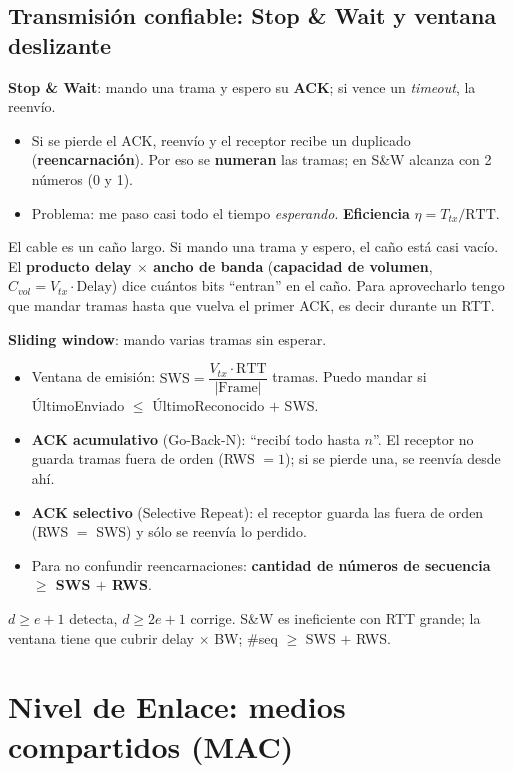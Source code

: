 \documentclass[10pt,a4paper]{article}
\newcommand{\term}[1]{\textbf{\color{azul}#1}}
\begin{document}
\subsection{Transmisión confiable: Stop \& Wait y ventana deslizante}
\textbf{Stop \& Wait}: mando una trama y espero su \term{ACK}; si vence un \emph{timeout}, la reenvío.
\begin{itemize}
  \item Si se pierde el ACK, reenvío y el receptor recibe un duplicado (\term{reencarnación}). Por eso se \textbf{numeran} las tramas; en S\&W alcanza con 2 números (0 y 1).
  \item Problema: me paso casi todo el tiempo \emph{esperando}. \term{Eficiencia} $\eta = T_{tx}/\text{RTT}$.
\end{itemize}

\begin{idea}
El cable es un caño largo. Si mando una trama y espero, el caño está casi vacío. El \term{producto delay $\times$ ancho de banda}
(\term{capacidad de volumen}, $C_{vol} = V_{tx}\cdot\text{Delay}$) dice cuántos bits ``entran'' en el caño. Para aprovecharlo tengo que mandar
tramas hasta que vuelva el primer ACK, es decir durante un RTT.
\end{idea}
\textbf{Sliding window}: mando varias tramas sin esperar.
\begin{itemize}
  \item Ventana de emisión: $\text{SWS} = \dfrac{V_{tx}\cdot \text{RTT}}{|\text{Frame}|}$ tramas. Puedo mandar si ÚltimoEnviado $\le$ ÚltimoReconocido $+$ SWS.
  \item \term{ACK acumulativo} (Go-Back-N): ``recibí todo hasta $n$''. El receptor no guarda tramas fuera de orden (RWS $=1$); si se pierde una, se reenvía desde ahí.
  \item \term{ACK selectivo} (Selective Repeat): el receptor guarda las fuera de orden (RWS $=$ SWS) y sólo se reenvía lo perdido.
  \item Para no confundir reencarnaciones: \textbf{cantidad de números de secuencia $\ge$ SWS $+$ RWS}.
\end{itemize}
\begin{clave}
$d\ge e+1$ detecta, $d\ge 2e+1$ corrige. S\&W es ineficiente con RTT grande; la ventana tiene que cubrir delay $\times$ BW; \#seq $\ge$ SWS $+$ RWS.
\end{clave}

\section{Nivel de Enlace: medios compartidos (MAC)}
\end{document}
